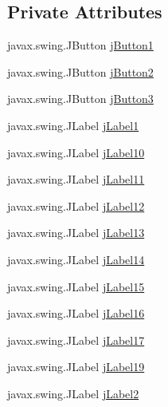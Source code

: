 \subsection*{Private Attributes}
\begin{DoxyCompactItemize}
\item 
javax.\+swing.\+J\+Button \mbox{\hyperlink{classsoftware_1_1validornotvalid_a4322ace1270f409aa8ada36dd8fde2e5}{j\+Button1}}
\item 
javax.\+swing.\+J\+Button \mbox{\hyperlink{classsoftware_1_1validornotvalid_a18b41fd0e21eac702ca4a03b9a10285b}{j\+Button2}}
\item 
javax.\+swing.\+J\+Button \mbox{\hyperlink{classsoftware_1_1validornotvalid_ab48fb28356cce2216dcac1cb0131624c}{j\+Button3}}
\item 
javax.\+swing.\+J\+Label \mbox{\hyperlink{classsoftware_1_1validornotvalid_ad6cb9e904f7cb7d49c96c66285d81f2f}{j\+Label1}}
\item 
javax.\+swing.\+J\+Label \mbox{\hyperlink{classsoftware_1_1validornotvalid_a2255215afcbe0670ccbeec10ca5c7aca}{j\+Label10}}
\item 
javax.\+swing.\+J\+Label \mbox{\hyperlink{classsoftware_1_1validornotvalid_aa639ffbcb05919b5b8be27b096c874da}{j\+Label11}}
\item 
javax.\+swing.\+J\+Label \mbox{\hyperlink{classsoftware_1_1validornotvalid_a5a7bbbddab22b0193c6b6776c7aa5f6b}{j\+Label12}}
\item 
javax.\+swing.\+J\+Label \mbox{\hyperlink{classsoftware_1_1validornotvalid_abaafc4b5c74ef3845c0469f1bf1ae5eb}{j\+Label13}}
\item 
javax.\+swing.\+J\+Label \mbox{\hyperlink{classsoftware_1_1validornotvalid_a898329c2e85620214a3e83a8ec229895}{j\+Label14}}
\item 
javax.\+swing.\+J\+Label \mbox{\hyperlink{classsoftware_1_1validornotvalid_aa1a81f594817fe87cc5fbbd85d33aa8a}{j\+Label15}}
\item 
javax.\+swing.\+J\+Label \mbox{\hyperlink{classsoftware_1_1validornotvalid_a071acd2388aa23129a2da2e239c494d8}{j\+Label16}}
\item 
javax.\+swing.\+J\+Label \mbox{\hyperlink{classsoftware_1_1validornotvalid_a5db46900582e8dd06da0cae9038921c9}{j\+Label17}}
\item 
javax.\+swing.\+J\+Label \mbox{\hyperlink{classsoftware_1_1validornotvalid_a744ece24d9517e67e29e9c200e76b055}{j\+Label19}}
\item 
javax.\+swing.\+J\+Label \mbox{\hyperlink{classsoftware_1_1validornotvalid_a896d5beda5159ad343db01b03383b0f5}{j\+Label2}}

\end{DoxyCompactItemize}
